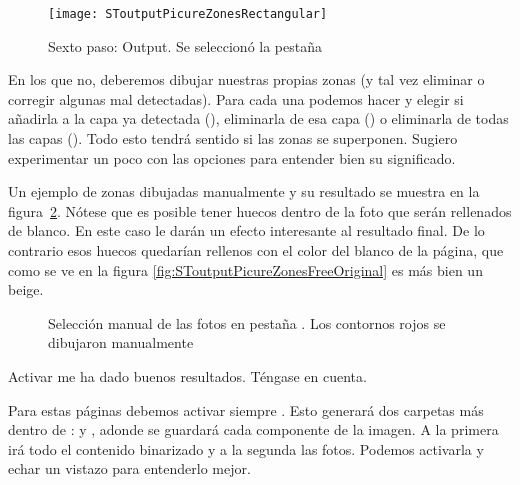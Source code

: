 \documentclass[%
	a5paper,
	10pt,
	twoside,
	openright,
	final,
]{memoir}
\begin{document}
	\begin{figure}
		\centering
		\texttt{[image: SToutputPicureZonesRectangular]}
		\caption[Sexto paso: Output. Se seleccionó la pestaña Picture zones]{Sexto paso: Output. Se seleccionó la pestaña \label{fig:SToutputPicureZonesRectangular}}
	\end{figure}

	En los que no, deberemos dibujar nuestras propias zonas (y tal vez eliminar o corregir algunas mal detectadas). Para cada una podemos hacer  y elegir si añadirla a la capa ya detectada (), eliminarla de esa capa () o eliminarla de todas las capas (). Todo esto tendrá sentido si las zonas se superponen. Sugiero experimentar un poco con las opciones para entender bien su significado.

	Un ejemplo de zonas dibujadas manualmente y su resultado se muestra en la figura~\ref{fig:SToutputPicureZonesFree}. Nótese que es posible tener huecos dentro de la foto que serán rellenados de blanco. En este caso le darán un efecto interesante al resultado final. De lo contrario esos huecos quedarían rellenos con el color del blanco de la página, que como se ve en la figura \ref{fig:SToutputPicureZonesFreeOriginal} es más bien un beige.

	\begin{figure}
		\caption[Selección manual de las fotos en pestaña Picture Zones]{Selección manual de las fotos en pestaña . Los contornos rojos se dibujaron manualmente\label{fig:SToutputPicureZonesFree}}
	\end{figure}

	Activar  me ha dado buenos resultados. Téngase en cuenta.

	Para estas páginas debemos activar siempre . Esto generará dos carpetas más dentro de :  y , adonde se guardará cada componente de la imagen. A la primera irá todo el contenido binarizado y a la segunda las fotos. Podemos activarla y echar un vistazo para entenderlo mejor.
\end{document}
